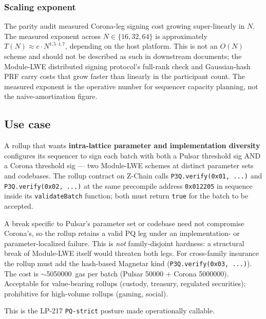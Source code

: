 \subsubsection{Scaling exponent}

The parity audit measured Corona-leg signing cost growing
super-linearly in $N$. The measured exponent across
$N \in \{16, 32, 64\}$ is approximately
$T(N) \approx c \cdot N^{1.5\text{--}1.7}$, depending on the
host platform. This is not an $O(N)$ scheme and should not be
described as such in downstream documents; the Module-LWE
distributed signing protocol's full-rank check and
Gaussian-hash PRF carry costs that grow faster than linearly in
the participant count. The measured exponent is the operative
number for sequencer capacity planning, not the
naive-amortization figure.

\subsection{Use case}

A rollup that wants \textbf{intra-lattice parameter and
implementation diversity} configures its sequencer to sign each
batch with both a Pulsar threshold sig AND a Corona threshold
sig --- two Module-LWE schemes at distinct parameter sets and
codebases. The rollup contract on Z-Chain calls
\texttt{P3Q.verify(0x01, ...)} and \texttt{P3Q.verify(0x02, ...)}
at the same precompile address \texttt{0x012205} in sequence
inside its \texttt{validateBatch} function; both must return
\texttt{true} for the batch to be accepted.

A break specific to Pulsar's parameter set or codebase need not
compromise Corona's, so the rollup retains a valid PQ leg under
an implementation- or parameter-localized failure. This is
\emph{not} family-disjoint hardness: a structural break of
Module-LWE itself would threaten both legs. For cross-family
insurance the rollup must add the hash-based Magnetar kind
(\texttt{P3Q.verify(0x03, ...)}). The cost is
$\sim$\SI{5050000}{gas} per batch (Pulsar \SI{50000}{} +
Corona \SI{5000000}{}). Acceptable for value-bearing rollups
(custody, treasury, regulated securities); prohibitive for
high-volume rollups (gaming, social).

This is the LP-217 \texttt{PQ-strict} posture made operationally
callable.
